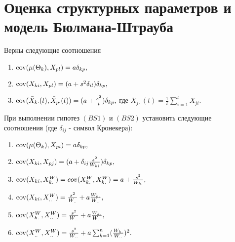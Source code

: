 \chapter{Оценка структурных параметров и модель Бюлмана-Штрауба}

\problem{}
Верны следующие соотношения 
\begin{enumerate}
    \item $\operatorname*{cov}(\mu(\Theta_k),X_{pl})=a\delta_{kp},$ 
    \item $\operatorname*{cov}(X_{ki}, X_{pl})=(a+s^2\delta_{il})\delta_{kp},$
    \item $\operatorname*{cov}(\bar{X}_{k\cdot}(t), \bar{X}_{p\cdot}(t))=(a+\frac{s^2}{t})\delta_{kp},$ где $\bar{X}_{j\cdot}(t)=\frac{1}{t}\sum_{i=1}^t X_{ji}$. 
\end{enumerate} 

\solution{}









\problem{}
При выполнении гипотез $(BS1)$  и $(BS2)$  установить следующие соотношения (где $\delta_{ij}$  - символ Кронекера): 
\begin{enumerate}
\item $\operatorname*{cov}(\mu(\Theta_k),X_{pi})=a\delta_{kp},$ 
\item $\operatorname*{cov}(X_{ki},X_{pj})=(a+\delta_{ij}\frac{s^2}{W_{ki}})\delta_{kp},$ 
\item $\operatorname*{cov}(X_{ki},X_{k.}^W)=cov(X_{k.}^W,X_{k.}^W)=a+\frac{s^2}{W_{k.}},$ 
\item $\operatorname*{cov}(X_{ki},X_{..}^W)=\frac{s^2}{W_{..}}+a\frac{W_{k.}}{W_{..}},$ 
\item $\operatorname*{cov}(X_{k.}^W,X_{..}^W)=\frac{s^2}{W_{..}}+a\frac{W_{k.}}{W_{..}},$ 
\item $\operatorname*{cov}(X_{..}^W,X_{..}^W)=\frac{s^2}{W_{..}}+a\sum_{k=1}^n(\frac{W_{k.}}{W_{..}})^2.$ 
\end{enumerate}
\solution{}